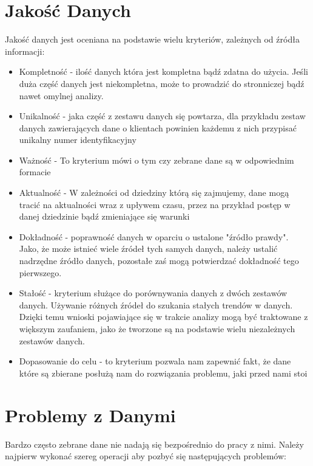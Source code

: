 \documentclass{book}
\begin{document}
\section{Jakość Danych}
Jakość danych jest oceniana na podstawie wielu kryteriów, zależnych od źródła informacji\cite{data_quality}:
\begin{itemize}
    \item Kompletność - ilość danych która jest kompletna bądź zdatna do użycia. Jeśli duża 
    część danych jest niekompletna, może to prowadzić do stronniczej bądź nawet omylnej analizy. 
    \item Unikalność - jaka część z zestawu danych się powtarza, 
    dla przykładu zestaw danych zawierających dane o klientach 
    powinien każdemu z nich przypisać unikalny numer identyfikacyjny
    \item Ważność - To kryterium mówi o tym czy zebrane dane są w odpowiednim formacie
    \item Aktualność - W zależności od dziedziny którą się zajmujemy, dane mogą tracić na aktualności wraz 
    z upływem czasu, przez na przykład postęp w danej 
    dziedzinie bądź zmieniające się warunki
    \item Dokładność - poprawność danych w oparciu o ustalone "źródło prawdy". 
    Jako, że może istnieć wiele źródeł tych samych danych, 
    należy ustalić nadrzędne źródło danych, pozostałe 
    zaś mogą potwierdzać dokładność tego pierwszego.
    \item Stałość - kryterium służące do porównywania danych z dwóch zestawów danych. 
    Używanie różnych źródeł do szukania stałych trendów w danych. 
    Dzięki temu wnioski pojawiające się w trakcie analizy mogą być 
    traktowane z większym zaufaniem, jako że tworzone są na podstawie wielu niezależnych zestawów danych.
    \item Dopasowanie do celu - to kryterium pozwala nam zapewnić fakt, 
    że dane które są zbierane posłużą nam do rozwiązania problemu, jaki przed nami stoi
  \end{itemize}

\section{Problemy z Danymi}

Bardzo często zebrane dane nie nadają się bezpośrednio do pracy z nimi. 
Należy najpierw wykonać szereg operacji aby pozbyć się następujących 
problemów:   
\end{document}
